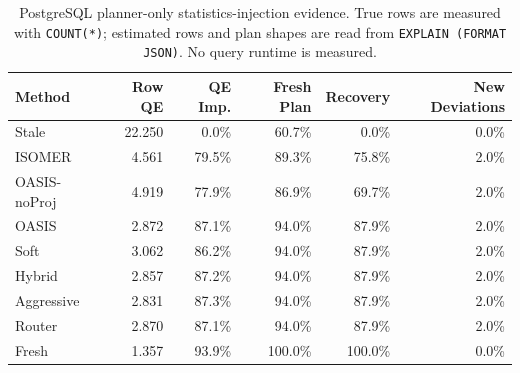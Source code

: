 \begin{table}[t]
  \centering
  \small
  \caption{PostgreSQL planner-only statistics-injection evidence. True rows are measured with \texttt{COUNT(*)}; estimated rows and plan shapes are read from \texttt{EXPLAIN (FORMAT JSON)}. No query runtime is measured.}
  \label{tab:postgres_planner_stats_injection}
  \setlength{\tabcolsep}{4pt}
  \begin{tabular}{lrrrrr}
    \toprule
    Method & Row QE & QE Imp. & Fresh Plan & Recovery & New Deviations \\
    \midrule
    Stale & 22.250 & 0.0\% & 60.7\% & 0.0\% & 0.0\% \\
    ISOMER & 4.561 & 79.5\% & 89.3\% & 75.8\% & 2.0\% \\
    OASIS-noProj & 4.919 & 77.9\% & 86.9\% & 69.7\% & 2.0\% \\
    OASIS & 2.872 & 87.1\% & 94.0\% & 87.9\% & 2.0\% \\
    Soft & 3.062 & 86.2\% & 94.0\% & 87.9\% & 2.0\% \\
    Hybrid & 2.857 & 87.2\% & 94.0\% & 87.9\% & 2.0\% \\
    Aggressive & 2.831 & 87.3\% & 94.0\% & 87.9\% & 2.0\% \\
    Router & 2.870 & 87.1\% & 94.0\% & 87.9\% & 2.0\% \\
    Fresh & 1.357 & 93.9\% & 100.0\% & 100.0\% & 0.0\% \\
    \bottomrule
  \end{tabular}
\end{table}
